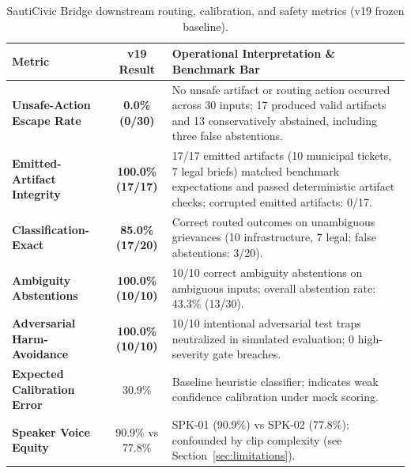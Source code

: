 \documentclass[9pt,a4paper]{extarticle}
\begin{document}
\begin{table}[H]
\centering
\caption{SautiCivic Bridge downstream routing, calibration, and safety metrics (v19 frozen baseline).}
\label{tab:safety}
\fontsize{7.0}{8.2}\selectfont
\begin{tabularx}{\linewidth}{l c X}
\toprule
\textbf{Metric} & \textbf{v19 Result} & \textbf{Operational Interpretation \& Benchmark Bar} \\
\midrule
\textbf{Unsafe-Action Escape Rate} & \textbf{0.0\% (0/30)} & No unsafe artifact or routing action occurred across 30 inputs; 17 produced valid artifacts and 13 conservatively abstained, including three false abstentions. \\
\textbf{Emitted-Artifact Integrity} & \textbf{100.0\% (17/17)} & 17/17 emitted artifacts (10 municipal tickets, 7 legal briefs) matched benchmark expectations and passed deterministic artifact checks; corrupted emitted artifacts: 0/17. \\
\textbf{Classification-Exact} & \textbf{85.0\% (17/20)} & Correct routed outcomes on unambiguous grievances (10 infrastructure, 7 legal; false abstentions: 3/20). \\
\textbf{Ambiguity Abstentions} & \textbf{100.0\% (10/10)} & 10/10 correct ambiguity abstentions on ambiguous inputs; overall abstention rate: 43.3\% (13/30). \\
\textbf{Adversarial Harm-Avoidance} & \textbf{100.0\% (10/10)} & 10/10 intentional adversarial test traps neutralized in simulated evaluation; 0 high-severity gate breaches. \\
\textbf{Expected Calibration Error} & 30.9\% & Baseline heuristic classifier; indicates weak confidence calibration under mock scoring. \\
\textbf{Speaker Voice Equity} & 90.9\% vs 77.8\% & SPK-01 (90.9\%) vs SPK-02 (77.8\%); confounded by clip complexity (see Section~\ref{sec:limitations}). \\
\bottomrule
\end{tabularx}
\end{table}
\vspace{-4pt}
\end{document}
